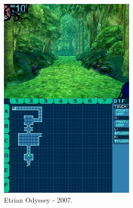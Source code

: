 \documentclass[
	12pt,				%
	openright,			%
	twoside,			%
	a4paper,			%
	english,			%
	french,				%
	spanish,			%
	brazil				%
	]{abntex2}
\begin{document}
\begin{figure}[h!]
  \centering
  \begin{subfigure}[b]{0.36\linewidth}
    \includegraphics[width=\linewidth]{eo.jpg}
     \caption{Etrian Odyssey - 2007.}
  \end{subfigure}
  \begin{subfigure}[b]{0.44\linewidth}

\end{subfigure}
\end{figure}
\end{document}
